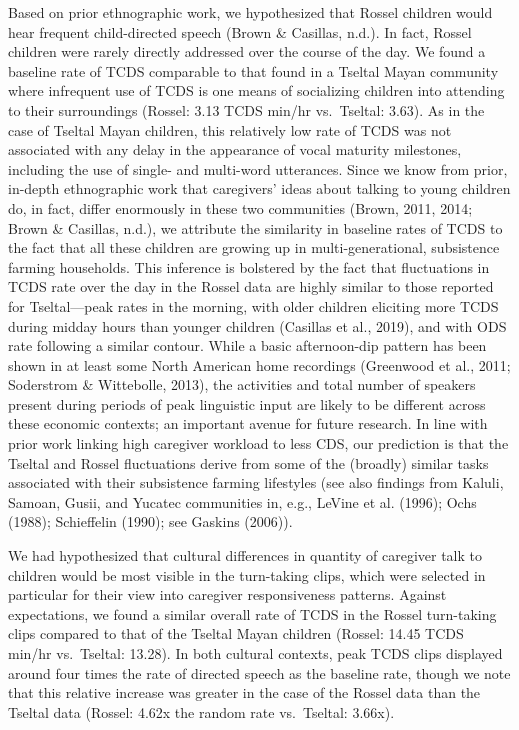 \documentclass[
  english,
  ,man,floatsintext]{apa6}
\begin{document}
Based on prior ethnographic work, we hypothesized that Rossel children would hear frequent child-directed speech (Brown \& Casillas, n.d.). In fact, Rossel children were rarely directly addressed over the course of the day. We found a baseline rate of TCDS comparable to that found in a Tseltal Mayan community where infrequent use of TCDS is one means of socializing children into attending to their surroundings (Rossel: 3.13 TCDS min/hr vs.~Tseltal: 3.63). As in the case of Tseltal Mayan children, this relatively low rate of TCDS was not associated with any delay in the appearance of vocal maturity milestones, including the use of single- and multi-word utterances. Since we know from prior, in-depth ethnographic work that caregivers' ideas about talking to young children do, in fact, differ enormously in these two communities (Brown, 2011, 2014; Brown \& Casillas, n.d.), we attribute the similarity in baseline rates of TCDS to the fact that all these children are growing up in multi-generational, subsistence farming households. This inference is bolstered by the fact that fluctuations in TCDS rate over the day in the Rossel data are highly similar to those reported for Tseltal---peak rates in the morning, with older children eliciting more TCDS during midday hours than younger children (Casillas et al., 2019), and with ODS rate following a similar contour. While a basic afternoon-dip pattern has been shown in at least some North American home recordings (Greenwood et al., 2011; Soderstrom \& Wittebolle, 2013), the activities and total number of speakers present during periods of peak linguistic input are likely to be different across these economic contexts; an important avenue for future research. In line with prior work linking high caregiver workload to less CDS, our prediction is that the Tseltal and Rossel fluctuations derive from some of the (broadly) similar tasks associated with their subsistence farming lifestyles (see also findings from Kaluli, Samoan, Gusii, and Yucatec communities in, e.g., LeVine et al. (1996); Ochs (1988); Schieffelin (1990); see Gaskins (2006)).

We had hypothesized that cultural differences in quantity of caregiver talk to children would be most visible in the turn-taking clips, which were selected in particular for their view into caregiver responsiveness patterns. Against expectations, we found a similar overall rate of TCDS in the Rossel turn-taking clips compared to that of the Tseltal Mayan children (Rossel: 14.45 TCDS min/hr vs.~Tseltal: 13.28). In both cultural contexts, peak TCDS clips displayed around four times the rate of directed speech as the baseline rate, though we note that this relative increase was greater in the case of the Rossel data than the Tseltal data (Rossel: 4.62x the random rate vs.~Tseltal: 3.66x).
\end{document}
